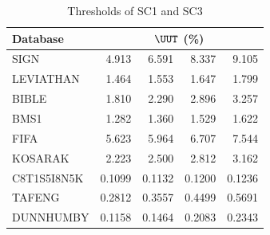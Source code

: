 \begin{table}[!htbp]\centering
\caption{Thresholds of SC1 and SC3}\label{tab:thresholds}
\begin{tabular*}{\textwidth}{@{\extracolsep\fill}lrrrr}\toprule
Database & \multicolumn{4}{c}{$\UUT$ (\%)} \\\midrule
SIGN & 4.913 & 6.591 & 8.337 & 9.105 \\
LEVIATHAN & 1.464 & 1.553 & 1.647 & 1.799 \\
BIBLE & 1.810 & 2.290 & 2.896 & 3.257 \\
BMS1 & 1.282 & 1.360 & 1.529 & 1.622 \\
FIFA & 5.623 & 5.964 & 6.707 & 7.544 \\
KOSARAK & 2.223 & 2.500 & 2.812 & 3.162 \\
C8T1S5I8N5K & 0.1099 & 0.1132 & 0.1200 & 0.1236 \\
TAFENG & 0.2812 & 0.3557 & 0.4499 & 0.5691 \\
DUNNHUMBY & 0.1158 & 0.1464 & 0.2083 & 0.2343 \\
\bottomrule\end{tabular*}
\end{table}
